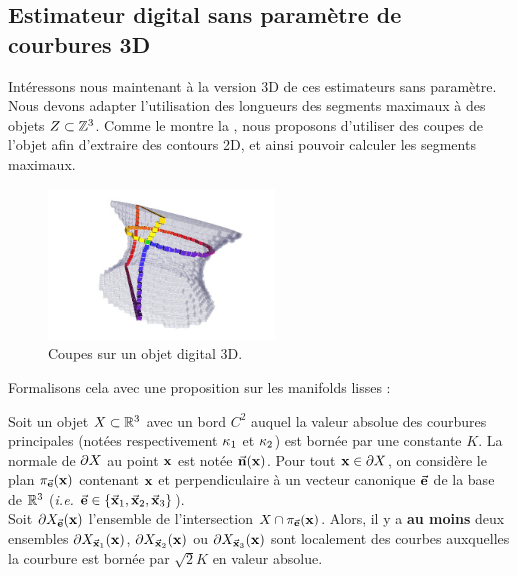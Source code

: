 \subsection{Estimateur digital sans paramètre de courbures 3D}
%
Intéressons nous maintenant à la version 3D de ces estimateurs sans paramètre.
Nous devons adapter l'utilisation des longueurs des segments maximaux à des
objets $Z \subset \mathbb{Z}^3$. Comme le montre la
, nous proposons d'utiliser des coupes de
l’objet afin d'extraire des contours 2D, et ainsi pouvoir calculer les segments
maximaux.
%
\begin{figure}[ht]
    \begin{center}
      \includegraphics[width=6cm]{images/Curvature/ctopo3dSurfelCut}
    \end{center}
    \caption[Coupes sur un objet digital 3D.]{Coupes sur un objet digital 3D.}
    \label{fig:3d-dig-object-slices}
\end{figure}
%
Formalisons cela avec une proposition sur les manifolds lisses :
%
\begin{proposition}
\label{prop:slices-3d}
  Soit un objet $X \subset \mathbb{R}^3$ avec un bord $C^2$ auquel la valeur
  absolue des courbures principales (notées respectivement $\kappa_{1}$ et
  $\kappa_{2}$) est bornée par une constante $K$. La normale de $\partial X$ au
  point $\mathbf{x}$ est notée $\vec{\mathbf{n}}(\mathbf{x})$. Pour tout $\mathbf{x} \in \partial X$, on
  considère le plan $\pi_{\vec{\mathbf{e}}}(\mathbf{x})$ contenant $\mathbf{x}$ et perpendiculaire à
  un vecteur canonique $\vec{\mathbf{e}}$ de la base de $\mathbb{R}^3$ (\emph{i.e.}
  $\vec{\mathbf{e}}\in\{ \vec{\mathbf{x}}_1, \vec{\mathbf{x}}_2, \vec{\mathbf{x}}_3 \}$).
  \\
  Soit $\partial X_{\vec{\mathbf{e}}}(\mathbf{x})$ l'ensemble de l'intersection $X
  \cap \pi_{\vec{\mathbf{e}}}(\mathbf{x})$. Alors, il y a \textbf{au moins} deux ensembles
  $\partial X_{\vec{\mathbf{x}}_1}(\mathbf{x})$, $\partial X_{\vec{\mathbf{x}}_2}(\mathbf{x})$ ou
  $\partial X_{\vec{\mathbf{x}}_3}(\mathbf{x})$ sont localement des courbes auxquelles la
  courbure est bornée par $\sqrt{2}K$ en valeur absolue.
\end{proposition}
